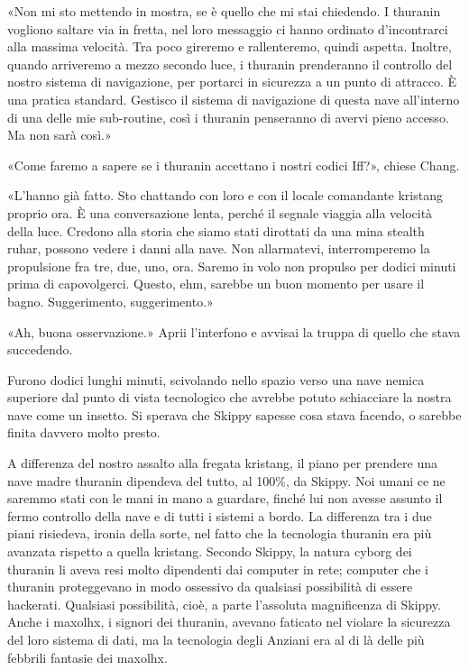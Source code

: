 «Non mi sto mettendo in mostra, se è quello che mi stai chiedendo. I
thuranin vogliono saltare via in fretta, nel loro messaggio ci hanno
ordinato d'incontrarci alla massima velocità. Tra poco gireremo e
rallenteremo, quindi aspetta. Inoltre, quando arriveremo a mezzo secondo
luce, i thuranin prenderanno il controllo del nostro sistema di
navigazione, per portarci in sicurezza a un punto di attracco. È una
pratica standard. Gestisco il sistema di navigazione di questa nave
all'interno di una delle mie sub-routine, così i thuranin penseranno di
avervi pieno accesso. Ma non sarà così.»

«Come faremo a sapere se i thuranin accettano i nostri codici Iff?»,
chiese Chang.

«L'hanno già fatto. Sto chattando con loro e con il locale comandante
kristang proprio ora. È una conversazione lenta, perché il segnale
viaggia alla velocità della luce. Credono alla storia che siamo stati
dirottati da una mina stealth ruhar, possono vedere i danni alla nave.
Non allarmatevi, interromperemo la propulsione fra tre, due, uno, ora.
Saremo in volo non propulso per dodici minuti prima di capovolgerci.
Questo, ehm, sarebbe un buon momento per usare il bagno. Suggerimento,
suggerimento.»

«Ah, buona osservazione.» Aprii l'interfono e avvisai la truppa di
quello che stava succedendo.

Furono dodici lunghi minuti, scivolando nello spazio verso una nave
nemica superiore dal punto di vista tecnologico che avrebbe potuto
schiacciare la nostra nave come un insetto. Si sperava che Skippy
sapesse cosa stava facendo, o sarebbe finita davvero molto presto.

A differenza del nostro assalto alla fregata kristang, il piano per
prendere una nave madre thuranin dipendeva del tutto, al 100\%, da
Skippy. Noi umani ce ne saremmo stati con le mani in mano a guardare,
finché lui non avesse assunto il fermo controllo della nave e di tutti i
sistemi a bordo. La differenza tra i due piani risiedeva, ironia della
sorte, nel fatto che la tecnologia thuranin era più avanzata rispetto a
quella kristang. Secondo Skippy, la natura cyborg dei thuranin li aveva
resi molto dipendenti dai computer in rete; computer che i thuranin
proteggevano in modo ossessivo da qualsiasi possibilità di essere
hackerati. Qualsiasi possibilità, cioè, a parte l'assoluta magnificenza
di Skippy. Anche i maxolhx, i signori dei thuranin, avevano faticato nel
violare la sicurezza del loro sistema di dati, ma la tecnologia degli
Anziani era al di là delle più febbrili fantasie dei maxolhx.

